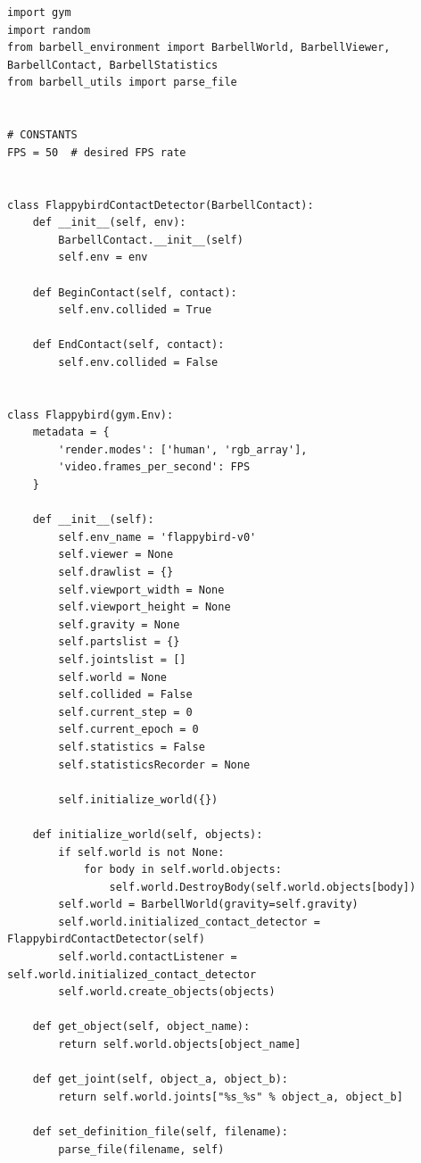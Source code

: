 \documentclass[cic,tc]{iiufrgs}
\newenvironment{longlisting}{\captionsetup{type=listing}}{}
\begin{document}
\begin{longlisting}
\begin{verbatim}
import gym
import random
from barbell_environment import BarbellWorld, BarbellViewer, BarbellContact, BarbellStatistics
from barbell_utils import parse_file


# CONSTANTS
FPS = 50  # desired FPS rate


class FlappybirdContactDetector(BarbellContact):
    def __init__(self, env):
        BarbellContact.__init__(self)
        self.env = env

    def BeginContact(self, contact):
        self.env.collided = True

    def EndContact(self, contact):
        self.env.collided = False


class Flappybird(gym.Env):
    metadata = {
        'render.modes': ['human', 'rgb_array'],
        'video.frames_per_second': FPS
    }

    def __init__(self):
        self.env_name = 'flappybird-v0'
        self.viewer = None
        self.drawlist = {}
        self.viewport_width = None
        self.viewport_height = None
        self.gravity = None
        self.partslist = {}
        self.jointslist = []
        self.world = None
        self.collided = False
        self.current_step = 0
        self.current_epoch = 0
        self.statistics = False
        self.statisticsRecorder = None

        self.initialize_world({})

    def initialize_world(self, objects):
        if self.world is not None:
            for body in self.world.objects:
                self.world.DestroyBody(self.world.objects[body])
        self.world = BarbellWorld(gravity=self.gravity)
        self.world.initialized_contact_detector = FlappybirdContactDetector(self)
        self.world.contactListener = self.world.initialized_contact_detector
        self.world.create_objects(objects)

    def get_object(self, object_name):
        return self.world.objects[object_name]

    def get_joint(self, object_a, object_b):
        return self.world.joints["%s_%s" % object_a, object_b]

    def set_definition_file(self, filename):
        parse_file(filename, self)


\end{verbatim}
\end{longlisting}
\end{document}
